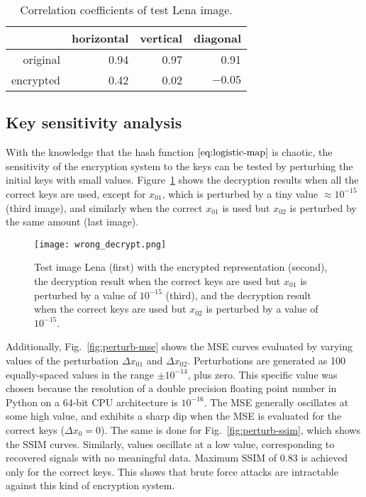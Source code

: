 \begin{table}
	\centering
	\caption{Correlation coefficients of test Lena image.}
	\label{tab:correlation}
	\begin{tabular}{rrrr}
		\toprule
		& horizontal & vertical & diagonal \\
		\midrule
		original & 0.94 & 0.97 & 0.91 \\
		encrypted & 0.42 & 0.02 & $-0.05$ \\
		\bottomrule
	\end{tabular}
\end{table}


\subsection{Key sensitivity analysis}
\label{ssec:image-encrypt-keysensitivity}
With the knowledge that the hash function $\eqref{eq:logistic-map}$ is chaotic, the sensitivity of the encryption system to the keys can be tested by perturbing the initial keys with small values. Figure~\ref{fig:wrong-decryption} shows the decryption results when all the correct keys are used, except for $x_{01}$, which is perturbed by a tiny value $\approx 10^{-15}$ (third image), and similarly when the correct $x_{01}$ is used but $x_{02}$ is perturbed by the same amount (last image).

\begin{figure}[htb]
	\texttt{[image: wrong\_decrypt.png]}
	\caption{Test image Lena (first) with the encrypted representation (second), the decryption result when the correct keys are used but $x_{01}$ is perturbed by a value of $10^{-15}$ (third), and the decryption result when the correct keys are used but $x_{02}$ is perturbed by a value of $10^{-15}$.}
	\label{fig:wrong-decryption}
\end{figure}

Additionally, Fig.~\ref{fig:perturb-mse} shows the MSE curves evaluated by varying values of the perturbation $\Delta x_{01}$ and $\Delta x_{02}$. Perturbations are generated as 100 equally-spaced values in the range $\pm 10^{-14}$, plus zero. This specific value was chosen because the resolution of a double precision floating point number in Python on a 64-bit CPU architecture is $10^{-16}$. The MSE generally oscillates at some high value, and exhibits a sharp dip when the MSE is evaluated for the correct keys ($\Delta x_0 = 0$). The same is done for Fig.~\ref{fig:perturb-ssim}, which shows the SSIM curves. Similarly, values oscillate at a low value, corresponding to recovered signals with no meaningful data. Maximum SSIM of 0.83 is achieved only for the correct keys. This shows that brute force attacks are intractable against this kind of encryption system.

